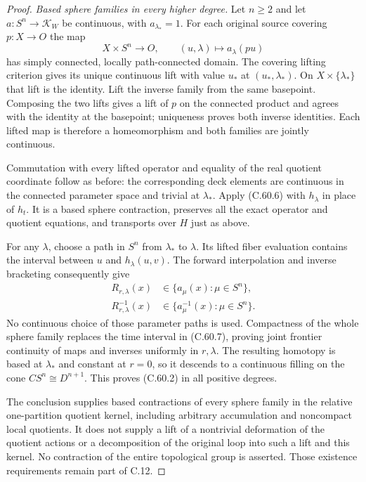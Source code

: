 \begin{proof}
\emph{Based sphere families in every higher degree.}
Let $n\geq2$ and let
$a:S^n\to\mathcal K_W$ be continuous, with
$a_{\lambda_*}=1$.
For each original source covering $p:X\to O$ the map
\[
 X\times S^n\longrightarrow O,\qquad
                  (u,\lambda)\longmapsto a_\lambda(pu)
                                                               \tag{C.60.8}
\]
has simply connected, locally path-connected domain.
The covering lifting criterion gives its unique
continuous lift with value $u_*$ at $(u_*,\lambda_*)$.
On $X\times\{\lambda_*\}$ that lift is the identity.
Lift the inverse family from the same basepoint.
Composing the two lifts gives a lift of $p$ on the
connected product and agrees with the identity at
the basepoint; uniqueness proves both inverse
identities. Each lifted map is therefore a
homeomorphism and both families are jointly continuous.

Commutation with every lifted operator and equality
of the real quotient coordinate follow as before:
the corresponding deck elements are continuous in
the connected parameter space and trivial at
$\lambda_*$. Apply (C.60.6) with $h_\lambda$ in place
of $h_t$. It is a based sphere contraction, preserves
all the exact operator and quotient equations, and
transports over $H$ just as above.

For any $\lambda$, choose a path in $S^n$ from
$\lambda_*$ to $\lambda$. Its lifted fiber evaluation
contains the interval between $u$ and
$h_\lambda(u,v)$. The forward interpolation and
inverse bracketing consequently give
\[
 \begin{split}
 R_{r,\lambda}(x)&\in
                       \{a_\mu(x):\mu\in S^n\},\\
 R_{r,\lambda}^{-1}(x)&\in
                       \{a_\mu^{-1}(x):\mu\in S^n\}.
 \end{split}                                             \tag{C.60.9}
\]
No continuous choice of those parameter paths is
used. Compactness of the whole sphere family
replaces the time interval in (C.60.7), proving
joint frontier continuity of maps and inverses
uniformly in $r,\lambda$.
The resulting homotopy is based at $\lambda_*$
and constant at $r=0$, so it descends to a
continuous filling on the cone $CS^n\cong D^{n+1}$.
This proves (C.60.2) in all positive degrees.

The conclusion supplies based contractions of every
sphere family in the relative one-partition quotient kernel,
including arbitrary accumulation and noncompact
local quotients. It does not supply a lift of a
nontrivial deformation of the quotient actions
or a decomposition of the original loop into
such a lift and this kernel. No contraction of the
entire topological group is asserted. Those existence
requirements remain part of C.12.
\end{proof}
